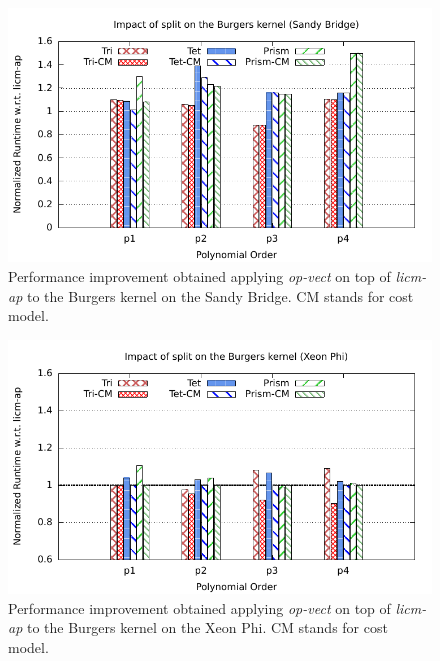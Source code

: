 \documentclass[conference]{IEEEtran}
\begin{document}
\begin{figure}[h]
\includegraphics[scale=0.7]{Pictures/burgers-normalized-split.pdf}
\caption{Performance improvement obtained applying \emph{op-vect} on top of \emph{licm-ap} to the Burgers kernel on the Sandy Bridge. CM stands for cost model.}
\label{fig:split-burgers-speedup}
\end{figure}

\begin{figure}[h]
\includegraphics[scale=0.7]{Pictures/burgers-normalized-split-phi.pdf}
\caption{Performance improvement obtained applying \emph{op-vect} on top of \emph{licm-ap} to the Burgers kernel on the Xeon Phi. CM stands for cost model.}
\label{fig:split-burgers-speedup-phi}
\end{figure}
\end{document}
